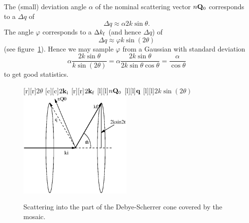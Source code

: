 The (small) deviation angle $\alpha$ of the nominal
scattering vector $n{\bf Q}_0$ corresponds to a $\Delta q$ of
\begin{equation}
\Delta q \approx \alpha 2k\sin\theta.
\end{equation}
The angle $\varphi$ corresponds to a $\Delta k_{\rm f}$ (and hence
$\Delta q$) of
\begin{equation}
\Delta q \approx \varphi k \sin(2\theta)
\end{equation}
(see figure~\ref{f:mosaic_cone}).
Hence we may sample $\varphi$ from a Gaussian with standard deviation
\begin{equation}
\alpha\frac{2k\sin\theta}{k\sin(2\theta)} =
\alpha\frac{2k\sin\theta}{2k\sin\theta\cos\theta} =
\frac{\alpha}{\cos\theta}
\end{equation}
to get good statistics.
%
\begin{figure}
  \begin{center}
    [r][r]{$2\theta$}
    [c][c]{$2{\bf k}_{\rm i}$}
    [r][r]{$2{\bf k}_{\rm f}$}
    [l][l]{$n{\bf Q}_0$}
    [l][l]{$\bf q$}
    [l][l]{$2 k \sin(2 \theta)$}
    \includegraphics[width=0.5\textwidth]{figures/mosaic_cone.eps}
  \end{center}
\caption{Scattering into the part of the Debye-Scherrer cone covered by
    the mosaic.}
\label{f:mosaic_cone}
\end{figure}

